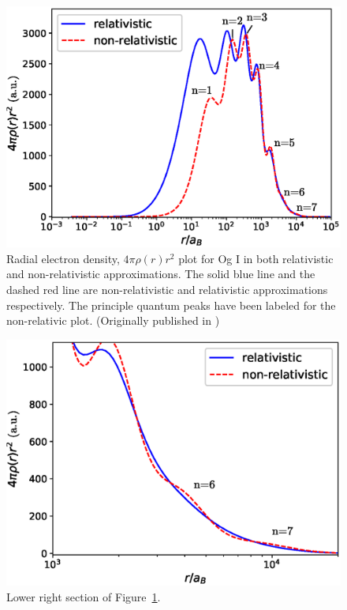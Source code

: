 \documentclass[10pt,a4paper, twoside]{report}
\begin{document}
\begin{figure} 
\includegraphics[scale=0.58]{./figures/Ogplot.eps}
\caption[Relativistic and non-relativistic radial electron density of Og I.]{Radial electron density, $4\pi\rho(r)r^2$ plot for Og I in both relativistic and non-relativistic approximations. The solid blue line and the dashed red line are non-relativistic and relativistic approximations respectively. The principle quantum peaks have been labeled for the non-relativic plot. (Originally published in \cite{LDFOg2018})\label{Og_plot}}
\end{figure}
\begin{figure}
\includegraphics[scale=0.55]{./figures/Ogplot_zoom.eps}
\caption{Lower right section of  Figure~\ref{Og_plot}.\label{Og_plot_zoom}}
\end{figure}
\end{document}
